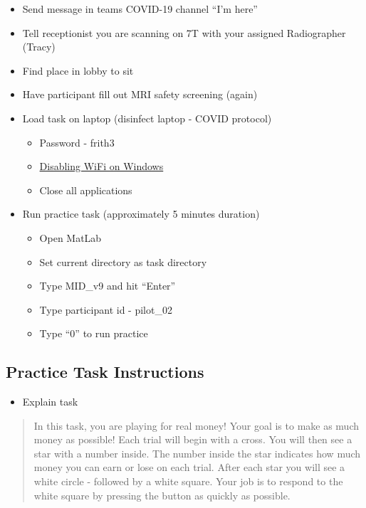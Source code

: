 \documentclass[
]{book}
\providecommand{\tightlist}{%
  \setlength{\itemsep}{0pt}\setlength{\parskip}{0pt}}
\begin{document}
\begin{itemize}
\tightlist
\item
  Send message in teams COVID-19 channel ``I'm here''
\item
  Tell receptionist you are scanning on 7T with your assigned Radiographer (Tracy)
\item
  Find place in lobby to sit
\item
  Have participant fill out MRI safety screening (again)
\item
  Load task on laptop (disinfect laptop - COVID protocol)

  \begin{itemize}
  \tightlist
  \item
    Password - frith3
  \item
    \protect\hyperlink{disabling-wifi-on-windows}{Disabling WiFi on Windows}
  \item
    Close all applications
  \end{itemize}
\item
  Run practice task (approximately 5 minutes duration)

  \begin{itemize}
  \tightlist
  \item
    Open MatLab
  \item
    Set current directory as task directory
  \item
    Type MID\_v9 and hit ``Enter''
  \item
    Type participant id - pilot\_02
  \item
    Type ``0'' to run practice
  \end{itemize}
\end{itemize}

\hypertarget{practice-task-instructions}{%
\subsection{Practice Task Instructions}\label{practice-task-instructions}}

\begin{itemize}
\tightlist
\item
  Explain task
\end{itemize}

\begin{quote}
In this task, you are playing for real money! Your goal is to make as much money as possible! Each trial will begin with a cross. You will then see a star with a number inside. The number inside the star indicates how much money you can earn or lose on each trial. After each star you will see a white circle - followed by a white square. Your job is to respond to the white square by pressing the button as quickly as possible.
\end{quote}
\end{document}

